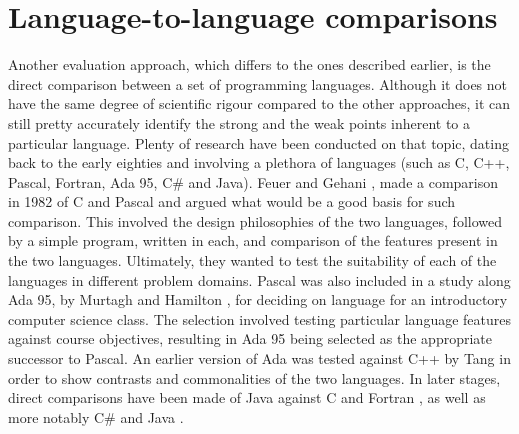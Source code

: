 \section{Language-to-language comparisons}
Another evaluation approach, which differs to the ones described earlier, is the direct comparison between a set of programming languages. Although it does not have the same degree of scientific rigour compared to the other approaches, it can still pretty accurately identify the strong and the weak points inherent to a particular language. Plenty of research have been conducted on that topic, dating back to the early eighties and involving a plethora of languages (such as C, C++, Pascal, Fortran, Ada 95, C\# and Java). Feuer and Gehani \cite{CandPascal},  made a comparison in 1982 of C and Pascal and argued what would be a good basis for such comparison. This involved the design philosophies of the two languages, followed by a simple program, written in each, and comparison of the features present in the two languages. Ultimately, they wanted to test the suitability of each of the languages in different problem domains. Pascal was also included in a study along Ada 95, by Murtagh and Hamilton \cite{AdaandPascal}, for deciding on language for an introductory computer science class. The selection involved testing particular language features against course objectives, resulting in Ada 95 being selected as the appropriate successor to Pascal. An earlier version of Ada was tested against C++ by Tang \cite{AdaandCplusplus} in order to show contrasts and commonalities of the two languages. In later stages, direct comparisons have been made of Java against C and Fortran \cite{CandFortranJava}, as well as more notably C\# and Java \cite{JavaCsharp}. 